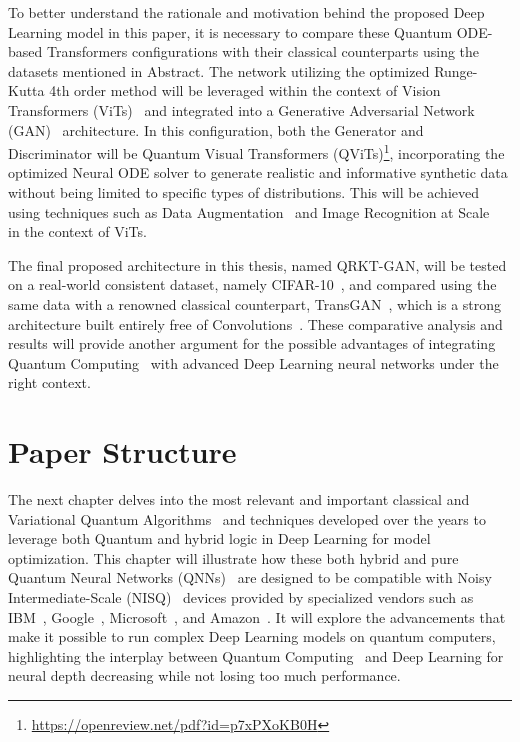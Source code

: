 \documentclass[12pt,a4paper]{report}
\begin{document}
To better understand the rationale and motivation behind the proposed Deep Learning model in this paper, it is necessary to compare these Quantum ODE-based Transformers configurations  with their classical counterparts using the datasets mentioned in Abstract. The network utilizing the optimized Runge-Kutta 4th order method will be leveraged within the context of Vision Transformers (ViTs)~\cite{vaswani2017attention, dosovitskiy2020} and integrated into a Generative Adversarial Network (GAN)~\cite{goodfellow2014generative} architecture. In this configuration, both the Generator and Discriminator will be Quantum Visual Transformers (QViTs)\footnote{\url{https://openreview.net/pdf?id=p7xPXoKB0H}}, incorporating the optimized Neural ODE solver to generate realistic and informative synthetic data without being limited to specific types of distributions. This will be achieved using techniques such as Data Augmentation~\cite{zhao2020diffaugment} and Image Recognition at Scale~\cite{dosovitskiy2020} in the context of ViTs.

The final proposed architecture in this thesis, named QRKT-GAN, will be tested on a real-world consistent dataset, namely CIFAR-10~\cite{Krizhevsky09learningmultiple}, and compared using the same data with a renowned classical counterpart, TransGAN~\cite{jiang2021transgan}, which is a strong architecture built entirely free of Convolutions~\cite{cordonnier2020relationship}. These comparative analysis and results will provide another argument for the possible advantages of integrating Quantum Computing~\cite{nielsen2001quantum} with advanced Deep Learning neural networks under the right context.
\section{Paper Structure}\vspace{-12pt}
The next chapter delves into the most relevant and important classical and Variational Quantum Algorithms~\cite{cerezo2021variational} and techniques developed over the years to leverage both Quantum and hybrid logic in Deep Learning for model optimization. This chapter will illustrate how these both hybrid and pure Quantum Neural Networks (QNNs)~\cite{breuckmann2018scalable} are designed to be compatible with Noisy Intermediate-Scale (NISQ)~\cite{lau2022nisq} devices provided by specialized vendors such as IBM~\cite{Santos_2016}, Google~\cite{kalai2023googles}, Microsoft~\cite{Mykhailova_2023}, and Amazon~\cite{Reyes_2021}. It will explore the advancements that make it possible to run complex Deep Learning models on quantum computers, highlighting the interplay between Quantum Computing~\cite{nielsen2001quantum} and Deep Learning for neural depth decreasing while not losing too much performance.
\end{document}
